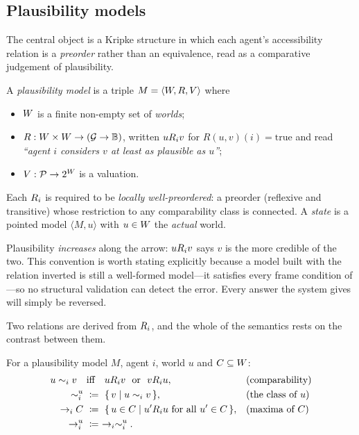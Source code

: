 \documentclass[11pt,a4paper]{article}
\begin{document}
\subsection{Plausibility models}

The central object is a Kripke structure in which each agent's accessibility relation is a
\emph{preorder} rather than an equivalence, read as a comparative judgement of plausibility.

\begin{definition}
\label{def:model}
A \emph{plausibility model} is a triple $M = \langle W, R, V\rangle$ where
\begin{itemize}
  \item $W$ is a finite non-empty set of \emph{worlds};
  \item $R : W \times W \to (\mathcal{G} \to \mathbb{B})$, written $u R_{i} v$ for
    $R(u,v)(i) = \mathrm{true}$ and read \emph{``agent $i$ considers $v$ at least as
    plausible as $u$''};
  \item $V : \mathcal{P} \to 2^{W}$ is a valuation.
\end{itemize}
Each $R_{i}$ is required to be \emph{locally well-preordered}: a preorder (reflexive and
transitive) whose restriction to any comparability class is connected. A \emph{state} is a
pointed model $\langle M, u\rangle$ with $u \in W$ the \emph{actual} world.
\end{definition}

\begin{remark}
\label{rem:direction}
Plausibility \emph{increases} along the arrow: $u R_{i} v$ says $v$ is the more credible
of the two. This convention is worth stating explicitly because a model built with the
relation inverted is still a well-formed model---it satisfies every frame condition of
---so no structural validation can detect the error. Every answer the system
gives will simply be reversed.
\end{remark}

Two relations are derived from $R_{i}$, and the whole of the semantics rests on the
contrast between them.

\begin{definition}
\label{def:derived}
For a plausibility model $M$, agent $i$, world $u$ and $C \subseteq W$:
\begin{align}
  u \sim_{i} v \quad&\text{iff}\quad u R_{i} v \ \text{ or }\ v R_{i} u,
    &&\text{(comparability)}\\
  \sim_{i}^{u} \ &\coloneqq\ \{\, v \mid u \sim_{i} v \,\},
    &&\text{(the class of $u$)}\\
  \rightarrow_{i} C \ &\coloneqq\ \{\, u \in C \mid u' R_{i} u \text{ for all } u' \in C \,\},
    &&\text{(maxima of $C$)}\\
  \rightarrow_{i}^{u} \ &\coloneqq\ \rightarrow_{i} \sim_{i}^{u}. &&
\end{align}
\end{definition}
\end{document}
